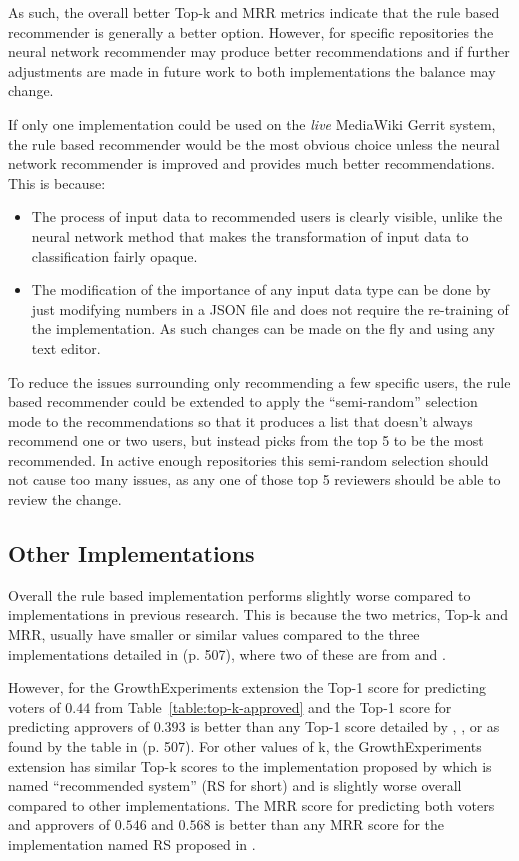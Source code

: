 As such, the overall better Top-k and MRR metrics indicate that the rule based recommender is generally a better option. However, for specific repositories the neural network recommender may produce better recommendations and if further adjustments are made in future work to both implementations the balance may change.

If only one implementation could be used on the \emph{live} MediaWiki Gerrit system, the rule based recommender would be the most obvious choice unless the neural network recommender is improved and provides much better recommendations. This is because:
\begin{itemize}
    \item The process of input data to recommended users is clearly visible, unlike the neural network method that makes the transformation of input data to classification fairly opaque.
    \item The modification of the importance of any input data type can be done by just modifying numbers in a JSON file and does not require the re-training of the implementation. As such changes can be made on the fly and using any text editor.
\end{itemize}

To reduce the issues surrounding only recommending a few specific users, the rule based recommender could be extended to apply the ``semi-random'' selection mode to the recommendations so that it produces a list that doesn't always recommend one or two users, but instead picks from the top 5 to be the most recommended. In active enough repositories this semi-random selection should not cause too many issues, as any one of those top 5 reviewers should be able to review the change.

\subsection{Other Implementations\label{section:other-implementations-comparisons}}

Overall the rule based implementation performs slightly worse compared to implementations in previous research. This is because the two metrics, Top-k and MRR, usually have smaller or similar values compared to the three implementations detailed in \cite{9240650} (p. 507), where two of these are from \cite{7081824} and \cite{7332472}. 

However, for the GrowthExperiments extension the Top-1 score for predicting voters of \(0.44\) from Table~\ref{table:top-k-approved} and the Top-1 score for predicting approvers of \(0.393\) is better than any Top-1 score detailed by \cite{9240650}, \cite{7081824}, or \cite{7332472} as found by the table in \cite{9240650} (p. 507). For other values of k, the GrowthExperiments extension has similar Top-k scores to the implementation proposed by \cite{9240650} which is named ``recommended system'' (RS for short) and is slightly worse overall compared to other implementations. The MRR score for predicting both voters and approvers of \(0.546\) and \(0.568\) is better than any MRR score for the implementation named RS proposed in \cite{9240650}.

